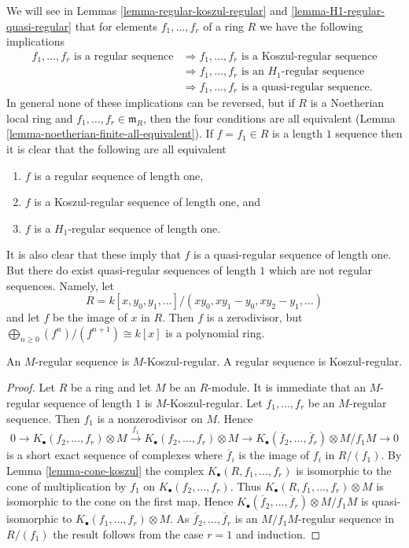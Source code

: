 \noindent
We will see in Lemmas \ref{lemma-regular-koszul-regular} and
\ref{lemma-H1-regular-quasi-regular} that for elements
$f_1, \ldots, f_r$ of a ring $R$ we have the following implications
\begin{align*}
f_1, \ldots, f_r\text{ is a regular sequence}
& \Rightarrow f_1, \ldots, f_r\text{ is a Koszul-regular sequence} \\
& \Rightarrow f_1, \ldots, f_r\text{ is an }H_1\text{-regular sequence} \\
& \Rightarrow f_1, \ldots, f_r\text{ is a quasi-regular sequence.}
\end{align*}
In general none of these implications can be reversed, but if $R$ is
a Noetherian local ring and $f_1, \ldots, f_r \in \mathfrak m_R$,
then the four conditions are all equivalent
(Lemma \ref{lemma-noetherian-finite-all-equivalent}).
If $f = f_1 \in R$ is a length $1$ sequence then it is clear that the
following are all equivalent
\begin{enumerate}
\item $f$ is a regular sequence of length one,
\item $f$ is a Koszul-regular sequence of length one, and
\item $f$ is a $H_1$-regular sequence of length one.
\end{enumerate}
It is also clear that these imply that $f$ is a quasi-regular sequence
of length one. But there do exist quasi-regular sequences of length $1$
which are not regular sequences. Namely, let
$$
R = k[x, y_0, y_1, \ldots]/(xy_0, xy_1 - y_0, xy_2 - y_1, \ldots)
$$
and let $f$ be the image of $x$ in $R$. Then $f$ is a zerodivisor, but
$\bigoplus_{n \geq 0} (f^n)/(f^{n + 1}) \cong k[x]$ is a polynomial ring.

\begin{lemma}
\label{lemma-regular-koszul-regular}
An $M$-regular sequence is $M$-Koszul-regular.
A regular sequence is Koszul-regular.
\end{lemma}

\begin{proof}
Let $R$ be a ring and let $M$ be an $R$-module.
It is immediate that an $M$-regular sequence of length $1$ is
$M$-Koszul-regular.
Let $f_1, \ldots, f_r$ be an $M$-regular sequence.
Then $f_1$ is a nonzerodivisor on $M$. Hence
$$
0 \to K_\bullet(f_2, \ldots, f_r) \otimes M
\xrightarrow{f_1}
K_\bullet(f_2, \ldots, f_r) \otimes M \to
K_\bullet(\overline{f}_2, \ldots, \overline{f}_r) \otimes M/f_1M \to 0
$$
is a short exact sequence of complexes where $\overline{f}_i$
is the image of $f_i$ in $R/(f_1)$. By
Lemma \ref{lemma-cone-koszul}
the complex $K_\bullet(R, f_1, \ldots, f_r)$
is isomorphic to the cone of multiplication by $f_1$
on $K_\bullet(f_2, \ldots, f_r)$. Thus
$K_\bullet(R, f_1, \ldots, f_r) \otimes M$ is isomorphic
to the cone on the first map. Hence
$K_\bullet(\overline{f}_2, \ldots, \overline{f}_r) \otimes M/f_1M$
is quasi-isomorphic to $K_\bullet(f_1, \ldots, f_r) \otimes M$.
As $\overline{f}_2, \ldots, \overline{f}_r$ is an $M/f_1M$-regular sequence
in $R/(f_1)$ the result follows from the case $r = 1$ and induction.
\end{proof}

